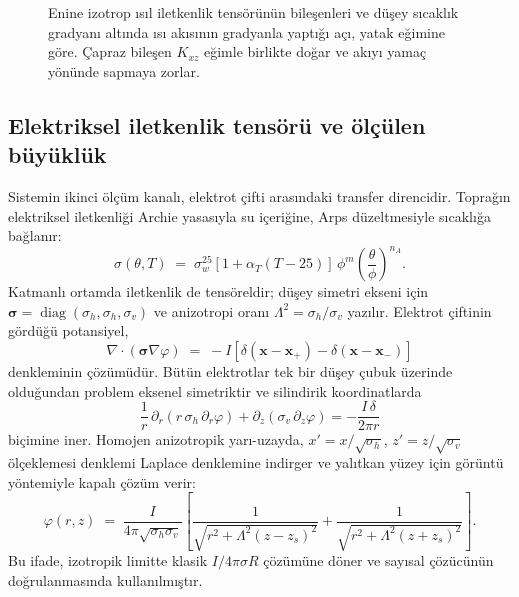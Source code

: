 \documentclass[11pt,a4paper]{article}
\newcommand{\Div}{\nabla\!\cdot\!}
\newcommand{\bsig}{\bm{\sigma}}
\begin{document}
\begin{figure}[htbp]\centering

\caption{Enine izotrop ısıl iletkenlik tensörünün bileşenleri ve düşey
sıcaklık gradyanı altında ısı akısının gradyanla yaptığı açı, yatak eğimine
göre. Çapraz bileşen $K_{xz}$ eğimle birlikte doğar ve akıyı yamaç yönünde
sapmaya zorlar.}
\label{fig:tensor}
\end{figure}

\subsection{Elektriksel iletkenlik tensörü ve ölçülen büyüklük}

Sistemin ikinci ölçüm kanalı, elektrot çifti arasındaki transfer direncidir.
Toprağın elektriksel iletkenliği Archie yasasıyla su içeriğine, Arps
düzeltmesiyle sıcaklığa bağlanır:
\begin{equation}
\sigma(\theta,T) \;=\; \sigma_w^{25}\left[1+\alpha_T (T-25)\right]\,
\phi^{m}\left(\frac{\theta}{\phi}\right)^{\! n_A}.
\label{eq:archie}
\end{equation}
Katmanlı ortamda iletkenlik de tensöreldir; düşey simetri ekseni için
$\bsig = \operatorname{diag}(\sigma_h,\sigma_h,\sigma_v)$ ve anizotropi oranı
$\Lambda^2 = \sigma_h/\sigma_v$ yazılır. Elektrot çiftinin gördüğü potansiyel,
\begin{equation}
\Div\!\left(\bsig\nabla\varphi\right) \;=\; -I\left[\delta(\mathbf{x}-\mathbf{x}_+)
- \delta(\mathbf{x}-\mathbf{x}_-)\right]
\label{eq:poisson}
\end{equation}
denkleminin çözümüdür. Bütün elektrotlar tek bir düşey çubuk üzerinde
olduğundan problem eksenel simetriktir ve silindirik koordinatlarda
\begin{equation}
\frac{1}{r}\,\partial_r\!\left(r\,\sigma_h\,\partial_r\varphi\right)
+ \partial_z\!\left(\sigma_v\,\partial_z\varphi\right)
= -\frac{I\,\delta}{2\pi r}
\end{equation}
biçimine iner. Homojen anizotropik yarı-uzayda, $x'=x/\sqrt{\sigma_h}$,
$z'=z/\sqrt{\sigma_v}$ ölçeklemesi denklemi Laplace denklemine indirger ve
yalıtkan yüzey için görüntü yöntemiyle kapalı çözüm verir:
\begin{equation}
\varphi(r,z) \;=\; \frac{I}{4\pi\sqrt{\sigma_h\sigma_v}}
\left[\frac{1}{\sqrt{r^2+\Lambda^2 (z-z_s)^2}}
    + \frac{1}{\sqrt{r^2+\Lambda^2 (z+z_s)^2}}\right].
\label{eq:analytic}
\end{equation}
Bu ifade, izotropik limitte klasik $I/4\pi\sigma R$ çözümüne döner ve sayısal
çözücünün doğrulanmasında kullanılmıştır.
\end{document}
